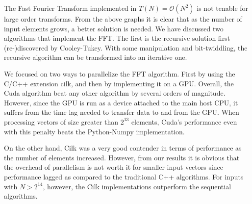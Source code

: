 The Fast Fourier Transform implemented in $T(N) = \mathcal{O}(N^2)$ is not tenable for large order transforms. From the above graphs it is clear that as the number of input elements grows, a better solution is needed. We have discussed two algorithms that implement the FFT. The first is the recursive solution first (re-)discovered by Cooley-Tukey. With some manipulation and bit-twiddling, the recursive algorithm can be transformed into an iterative one.

We focused on two ways to parallelize the FFT algorithm. First by using the C/C++ extension cilk, and then by implementing it on a GPU. Overall, the Cuda algorithm beat any other algorithm by several orders of magnitude. However, since the GPU is run as a device attached to the main host CPU, it suffers from the time lag needed to transfer data to and from the GPU. When processing vectors of size greater than $2^{13}$ elements, Cuda's performance even with this penalty beats the Python-Numpy implementation. 

On the other hand, Cilk was a very good contender in terms of performance as the number of elements increased. However, from our results it is obvious that the overhead of parallelism is not worth it for smaller input vectors since performance lagged as compared to the traditional C++ algorithms. For inputs with $N>2^{14}$, however, the Cilk implementations outperform the sequential algorithms. 